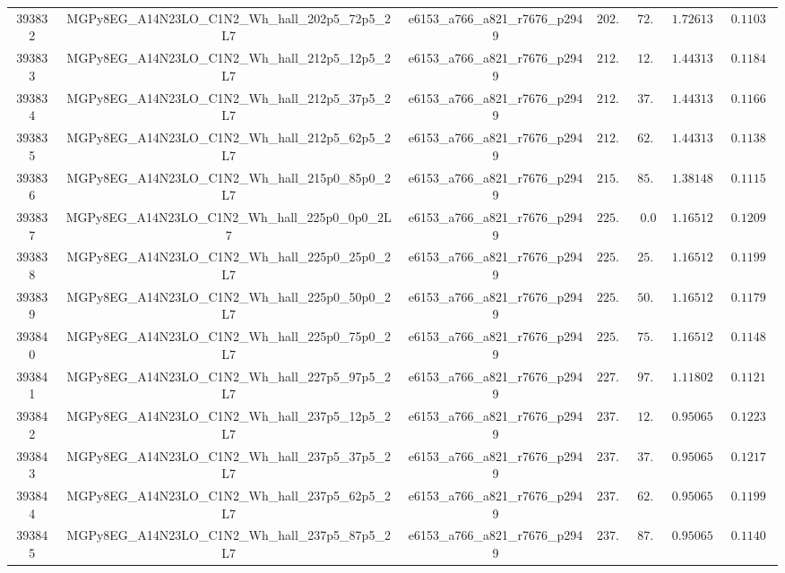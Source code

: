 \begin{table}[htbp]
\begin{center}
{\begin{tabular}{ccccccc}
393832 & MGPy8EG\_A14N23LO\_C1N2\_Wh\_hall\_202p5\_72p5\_2L7  & e6153\_a766\_a821\_r7676\_p2949 & $202.5$ & $72.5 $ & $1.726133  $ & $0.11031$ \\
393833 & MGPy8EG\_A14N23LO\_C1N2\_Wh\_hall\_212p5\_12p5\_2L7  & e6153\_a766\_a821\_r7676\_p2949 & $212.5$ & $12.5 $ & $1.443136  $ & $0.11842$ \\
393834 & MGPy8EG\_A14N23LO\_C1N2\_Wh\_hall\_212p5\_37p5\_2L7  & e6153\_a766\_a821\_r7676\_p2949 & $212.5$ & $37.5 $ & $1.443136  $ & $0.11662$ \\
393835 & MGPy8EG\_A14N23LO\_C1N2\_Wh\_hall\_212p5\_62p5\_2L7  & e6153\_a766\_a821\_r7676\_p2949 & $212.5$ & $62.5 $ & $1.443136  $ & $0.11380$ \\
393836 & MGPy8EG\_A14N23LO\_C1N2\_Wh\_hall\_215p0\_85p0\_2L7  & e6153\_a766\_a821\_r7676\_p2949 & $215.0$ & $85.0 $ & $1.381487  $ & $0.11159$ \\
393837 & MGPy8EG\_A14N23LO\_C1N2\_Wh\_hall\_225p0\_0p0\_2L7   & e6153\_a766\_a821\_r7676\_p2949 & $225.0$ & $0.0  $ & $1.165122  $ & $0.12090$ \\
393838 & MGPy8EG\_A14N23LO\_C1N2\_Wh\_hall\_225p0\_25p0\_2L7  & e6153\_a766\_a821\_r7676\_p2949 & $225.0$ & $25.0 $ & $1.165122  $ & $0.11996$ \\
393839 & MGPy8EG\_A14N23LO\_C1N2\_Wh\_hall\_225p0\_50p0\_2L7  & e6153\_a766\_a821\_r7676\_p2949 & $225.0$ & $50.0 $ & $1.165122  $ & $0.11794$ \\
393840 & MGPy8EG\_A14N23LO\_C1N2\_Wh\_hall\_225p0\_75p0\_2L7  & e6153\_a766\_a821\_r7676\_p2949 & $225.0$ & $75.0 $ & $1.165122  $ & $0.11487$ \\
393841 & MGPy8EG\_A14N23LO\_C1N2\_Wh\_hall\_227p5\_97p5\_2L7  & e6153\_a766\_a821\_r7676\_p2949 & $227.5$ & $97.5 $ & $1.118027  $ & $0.11211$ \\
393842 & MGPy8EG\_A14N23LO\_C1N2\_Wh\_hall\_237p5\_12p5\_2L7  & e6153\_a766\_a821\_r7676\_p2949 & $237.5$ & $12.5 $ & $0.950655  $ & $0.12238$ \\
393843 & MGPy8EG\_A14N23LO\_C1N2\_Wh\_hall\_237p5\_37p5\_2L7  & e6153\_a766\_a821\_r7676\_p2949 & $237.5$ & $37.5 $ & $0.950655  $ & $0.12171$ \\
393844 & MGPy8EG\_A14N23LO\_C1N2\_Wh\_hall\_237p5\_62p5\_2L7  & e6153\_a766\_a821\_r7676\_p2949 & $237.5$ & $62.5 $ & $0.950655  $ & $0.11997$ \\
393845 & MGPy8EG\_A14N23LO\_C1N2\_Wh\_hall\_237p5\_87p5\_2L7  & e6153\_a766\_a821\_r7676\_p2949 & $237.5$ & $87.5 $ & $0.950655  $ & $0.11401$ \\

\end{tabular}}
\end{center}
\end{table}
